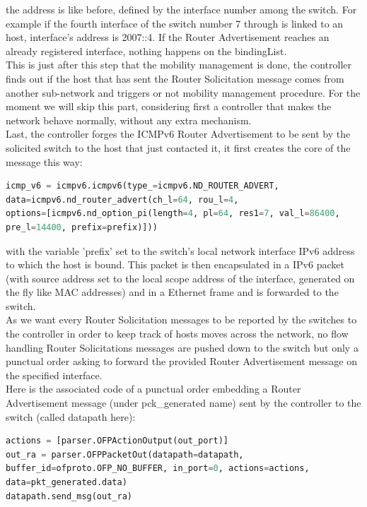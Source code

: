 \documentclass{article}
\begin{document}
the address is like before, defined by the interface number among the
switch. For example if the fourth interface of the switch number 7
through is linked to an host, interface's address is 2007::4.  If the
Router Advertisement reaches an already registered interface, nothing
happens on the bindingList.\\
\newline
This is just after this step that the mobility management is done,
the controller finds out if the host that has sent the Router
Solicitation message comes from another sub-network and triggers or
not mobility management procedure. For the moment we will skip this
part, considering first a controller that makes the network behave
normally, without any extra mechanism.\\
\newline
Last, the controller forges the ICMPv6 Router Advertisement to be sent
by the solicited switch to the host that just contacted it, it first
creates the core of the message this way: 

\begin{lstlisting}[frame=single,language=Python,breaklines=true ] 
icmp_v6 = icmpv6.icmpv6(type_=icmpv6.ND_ROUTER_ADVERT,
data=icmpv6.nd_router_advert(ch_l=64, rou_l=4,
options=[icmpv6.nd_option_pi(length=4, pl=64, res1=7, val_l=86400,
pre_l=14400, prefix=prefix)]))
\end{lstlisting}

with the variable 'prefix' set to the switch's local network interface
IPv6 address to which the host is bound. This packet is then
encapsulated in a IPv6 packet (with source address set to the local
scope address of the interface, generated on the fly like MAC
addresses) and in a Ethernet frame and is forwarded to the switch.\\ 
\newline
As we want every Router Solicitation messages to be reported by the
switches to the controller in order to keep track of hosts moves across
the network, no flow handling Router Solicitations messages are pushed
down to the switch but only a punctual order asking to forward the
provided Router Advertisement message on the specified interface.\\
\newline
Here is the associated code of a punctual order embedding a Router
Advertisement message (under pck\_generated name) sent by the controller
to the switch (called datapath here):

\begin{lstlisting}[frame=single,language=Python, breaklines=true] 
actions = [parser.OFPActionOutput(out_port)] 
out_ra = parser.OFPPacketOut(datapath=datapath,
buffer_id=ofproto.OFP_NO_BUFFER, in_port=0, actions=actions,
data=pkt_generated.data) 
datapath.send_msg(out_ra)
\end{lstlisting}
\end{document}
